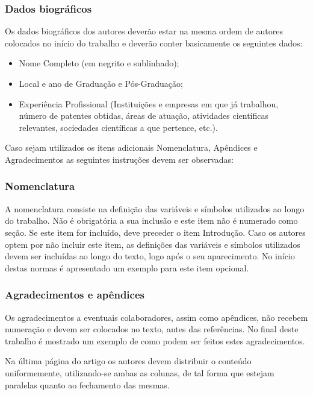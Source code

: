 \subsubsection{Dados biográficos} 
Os dados biográficos dos autores deverão estar na mesma ordem de autores colocados no início do trabalho e deverão conter basicamente os seguintes dados:
\begin{itemize}
	\item Nome Completo (em negrito e sublinhado);
	\item Local e ano de Graduação e Pós-Graduação;
	\item Experiência Profissional (Instituições e empresas em que já trabalhou, número de patentes obtidas, áreas de atuação, atividades científicas relevantes, sociedades científicas a que pertence, etc.). \newline
\end{itemize}

Caso sejam utilizados os itens adicionais Nomenclatura, Apêndices e Agradecimentos as seguintes instruções devem ser observadas:

\subsubsection{Nomenclatura} 
A nomenclatura consiste na definição das variáveis e símbolos utilizados ao longo do trabalho. Não é obrigatória a sua inclusão e este item não é numerado como seção. Se este item for incluído, deve preceder o item Introdução. Caso os autores optem por não incluir este item, as definições das variáveis e símbolos utilizados devem ser incluídas ao longo do texto, logo após o seu aparecimento. No início destas normas é apresentado um exemplo para este item opcional.

\vspace*{-0.1mm}
\subsubsection{Agradecimentos e apêndices} 
Os agradecimentos a eventuais colaboradores, assim como apêndices, não recebem numeração e devem ser colocados no texto, antes das referências.  No final deste trabalho  é mostrado um exemplo de como podem ser feitos estes agradecimentos.

Na última página do artigo os autores devem distribuir o conteúdo uniformemente, utilizando-se ambas as colunas, de tal forma que estejam paralelas quanto ao fechamento das mesmas.

